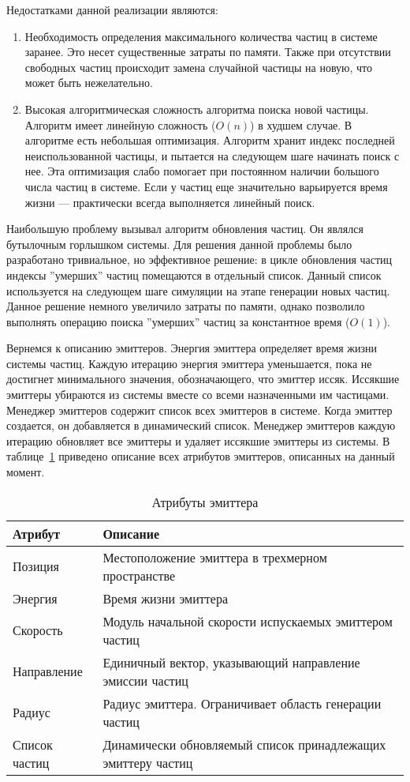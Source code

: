 Недостатками данной реализации являются:
\begin{enumerate}
    \item Необходимость определения максимального количества частиц в системе
    заранее. Это несет существенные затраты по памяти. Также при отсутствии
    свободных частиц происходит замена случайной частицы на новую, что может
    быть нежелательно.
    \item Высокая алгоритмическая сложность алгоритма поиска новой частицы.
    Алгоритм имеет линейную сложность ($O(n)$) в худшем случае. В алгоритме есть
    небольшая оптимизация. Алгоритм хранит индекс последней неиспользованной
    частицы, и пытается на следующем шаге начинать поиск с нее. Эта оптимизация
    слабо помогает при постоянном наличии большого числа частиц в системе.
    Если у частиц еще значительно варьируется время жизни --- практически всегда
    выполняется линейный поиск.
\end{enumerate}

Наибольшую проблему вызывал алгоритм обновления частиц. Он являлся бутылочным
горлышком системы. Для решения данной проблемы было разработано тривиальное, но
эффективное решение: в цикле обновления частиц индексы ''умерших'' частиц
помещаются в отдельный список. Данный список используется на следующем шаге
симуляции на этапе генерации новых частиц. Данное решение немного увеличило
затраты по памяти, однако позволило выполнять операцию поиска ''умерших'' частиц
за константное время ($O(1)$).

Вернемся к описанию эмиттеров. Энергия эмиттера определяет время жизни системы
частиц. Каждую итерацию энергия эмиттера уменьшается, пока не достигнет
минимального значения, обозначающего, что эмиттер иссяк. Иссякшие эмиттеры
убираются из системы вместе со всеми назначенными им частицами. Менеджер
эмиттеров содержит список всех эмиттеров в системе. Когда эмиттер создается, он
добавляется в динамический список. Менеджер эмиттеров каждую итерацию обновляет
все эмиттеры и удаляет иссякшие эмиттеры из системы. В
таблице~\ref{table:emitterAttribs} приведено описание всех атрибутов эмиттеров,
описанных на данный момент.
\begin{table}
\caption{Атрибуты эмиттера}%
\label{table:emitterAttribs}
\centering
\small
\begin{tabular}{| l | l |}
    \hline
    Атрибут & Описание \\
    \hline
    Позиция & Местоположение эмиттера в трехмерном пространстве \\
    Энергия & Время жизни эмиттера \\
    Скорость & Модуль начальной скорости испускаемых эмиттером частиц \\
    Направление & Единичный вектор, указывающий направление эмиссии частиц \\
    Радиус & Радиус эмиттера. Ограничивает область генерации частиц \\
    Список частиц & Динамически обновляемый список принадлежащих эмиттеру
    частиц \\
    \hline
\end{tabular}
\end{table}

